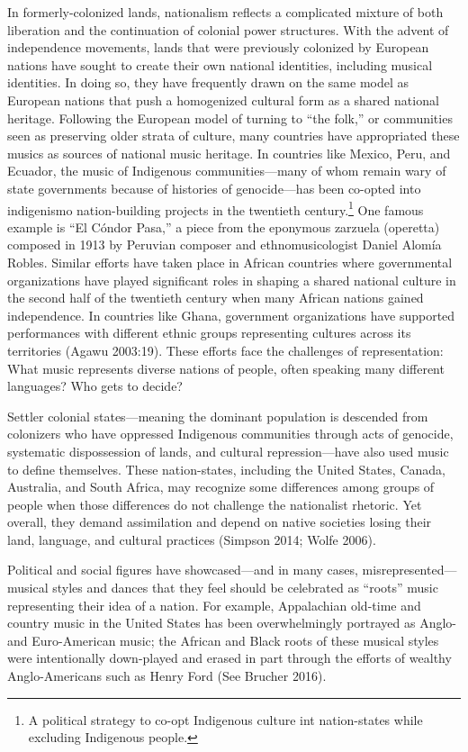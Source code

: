 \documentclass[twoside]{article}
\begin{document}
In formerly-colonized lands, nationalism reflects a complicated mixture
of both liberation and the continuation of colonial power structures.
With the advent of independence movements, lands that were previously
colonized by European nations have sought to create their own national
identities, including musical identities. In doing so, they have
frequently drawn on the same model as European nations that push a
homogenized cultural form as a shared national heritage. Following the
European model of turning to ``the folk,'' or communities seen as
preserving older strata of culture, many countries have appropriated
these musics as sources of national music heritage. In countries like
Mexico, Peru, and Ecuador, the music of Indigenous communities---many of
whom remain wary of state governments because of histories of
genocide---has been co-opted into indigenismo nation-building projects
in the twentieth century.\footnote{A political strategy to co-opt
  Indigenous culture int nation-states while excluding Indigenous
  people.} One famous example is ``El Cóndor Pasa,'' a piece from the
eponymous zarzuela (operetta) composed in 1913 by Peruvian composer and
ethnomusicologist Daniel Alomía Robles. Similar efforts have taken place
in African countries where governmental organizations have played
significant roles in shaping a shared national culture in the second
half of the twentieth century when many African nations gained
independence. In countries like Ghana, government organizations have
supported performances with different ethnic groups representing
cultures across its territories (Agawu 2003:19). These efforts face the
challenges of representation: What music represents diverse nations of
people, often speaking many different languages? Who gets to decide?

Settler colonial states---meaning the dominant population is descended from colonizers who have oppressed Indigenous communities through acts of genocide, systematic dispossession of lands, and cultural repression---have also used music to define themselves. These nation-states, including the United States, Canada, Australia, and South Africa, may recognize some differences among groups of people when those differences do not challenge the nationalist rhetoric. Yet overall, they demand assimilation and depend on native societies losing their land, language, and cultural practices (Simpson 2014; Wolfe 2006).

Political and social figures have showcased---and in many cases, misrepresented---musical styles and dances that they feel should be celebrated as ``roots'' music representing their idea of a nation. For example, Appalachian old-time and country music in the United States has been overwhelmingly portrayed as Anglo- and Euro-American music; the African and Black roots of these musical styles were intentionally down-played and erased in part through the efforts of wealthy Anglo-Americans such as Henry Ford (See Brucher 2016).
\end{document}
